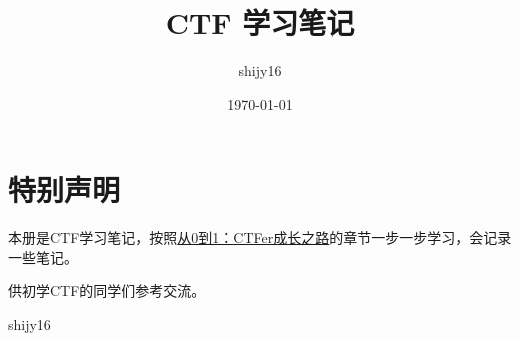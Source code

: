\documentclass[cn,11pt,chinese]{elegantbook}
\title{CTF 学习笔记}
\author{shijy16}
\date{\today}
\begin{document}
\maketitle

\chapter*{特别声明}
本册是CTF学习笔记，按照\href{https://book.nu1l.com/}{从0到1：CTFer成长之路}的章节一步一步学习，会记录一些笔记。

供初学CTF的同学们参考交流。

\vskip 1.5cm

\begin{flushright}
shijy16
\end{flushright}


\tableofcontents
\setcounter{page}{1}



\end{document}
